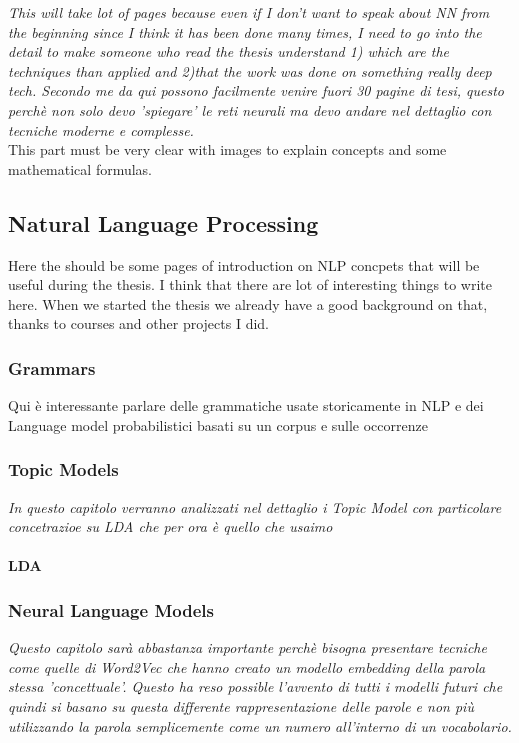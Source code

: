 \textit{This will take lot of pages because even if I don't want to speak about NN from the beginning since I think it has been done many times, I need to go into the detail to make someone who read the thesis understand 1) which are the techniques than applied and 2)that the work was done on something really deep tech. Secondo me da qui possono facilmente venire fuori 30 pagine di tesi, questo perchè non solo devo 'spiegare' le reti neurali ma devo andare nel dettaglio con tecniche moderne e complesse.} \\
This part must be very clear with images to explain concepts and some mathematical formulas.

\subsection{Natural Language Processing}
Here the should be some pages of introduction on NLP concpets that will be useful during the thesis. I think that there are lot of interesting things to write here. When we started the thesis we already have a good background on that, thanks to courses and other projects I did.
\subsubsection{Grammars}
Qui è interessante parlare delle grammatiche usate storicamente in NLP e dei Language model probabilistici basati su un corpus e sulle occorrenze

\subsubsection{Topic Models}
\textit{In questo capitolo verranno analizzati nel dettaglio i Topic Model con particolare concetrazioe su LDA che per ora è quello che usaimo}
\paragraph{LDA}
\label{sect:LDA}

\subsubsection{Neural Language Models}
\textit{Questo capitolo sarà abbastanza importante perchè bisogna presentare tecniche come quelle di Word2Vec che hanno creato un modello embedding della parola stessa 'concettuale'. Questo ha reso possible l'avvento di tutti i modelli futuri che quindi si basano su questa differente rappresentazione delle parole e non più utilizzando la parola semplicemente come un numero all'interno di un vocabolario.
}

